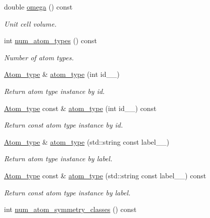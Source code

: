 \begin{DoxyCompactItemize}
\item 
double \hyperlink{classsirius_1_1_unit__cell_a4e3d00a7a45cfd2f7645588f525439b8}{omega} () const 
\begin{DoxyCompactList}\small\item\em Unit cell volume. \end{DoxyCompactList}\item 
int \hyperlink{classsirius_1_1_unit__cell_a0021ece9db70bed0575c656b5e58d65d}{num\+\_\+atom\+\_\+types} () const 
\begin{DoxyCompactList}\small\item\em Number of atom types. \end{DoxyCompactList}\item 
\hyperlink{classsirius_1_1_atom__type}{Atom\+\_\+type} \& \hyperlink{classsirius_1_1_unit__cell_a1ea078d2bead28d4b1ad5fb695b9c57f}{atom\+\_\+type} (int id\+\_\+\+\_\+)
\begin{DoxyCompactList}\small\item\em Return atom type instance by id. \end{DoxyCompactList}\item 
\hyperlink{classsirius_1_1_atom__type}{Atom\+\_\+type} const \& \hyperlink{classsirius_1_1_unit__cell_a9a6e6367689da13971da3a4dab37609c}{atom\+\_\+type} (int id\+\_\+\+\_\+) const 
\begin{DoxyCompactList}\small\item\em Return const atom type instance by id. \end{DoxyCompactList}\item 
\hyperlink{classsirius_1_1_atom__type}{Atom\+\_\+type} \& \hyperlink{classsirius_1_1_unit__cell_a9cb64348513a41da01eab5eb93e3eb34}{atom\+\_\+type} (std\+::string const label\+\_\+\+\_\+)
\begin{DoxyCompactList}\small\item\em Return atom type instance by label. \end{DoxyCompactList}\item 
\hyperlink{classsirius_1_1_atom__type}{Atom\+\_\+type} const \& \hyperlink{classsirius_1_1_unit__cell_a3c66ad4bb6a05861205c642df60b2a47}{atom\+\_\+type} (std\+::string const label\+\_\+\+\_\+) const 
\begin{DoxyCompactList}\small\item\em Return const atom type instance by label. \end{DoxyCompactList}\item 
int \hyperlink{classsirius_1_1_unit__cell_a8b2fe31247fbd07fcfbd4723b769c8f6}{num\+\_\+atom\+\_\+symmetry\+\_\+classes} () const 

\end{DoxyCompactItemize}
